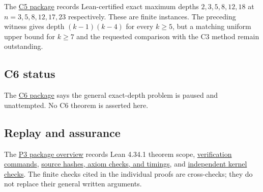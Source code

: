 \documentclass[11pt,a4paper]{article}
\begin{document}
The \href{https://github.com/mpelteshki/climbing-to-the-frontier/blob/212bba53b1818c08c40b8c4b48f636651eaf6410/cagent/p3/c5/README.md}{C5 package} records Lean-certified exact maximum depths \(2,3,5,8,12,18\) at \(n=3,5,8,12,17,23\) respectively. These are finite instances. The preceding witness gives depth \((k-1)(k-4)\) for every \(k\ge5\), but a matching uniform upper bound for \(k\ge7\) and the requested comparison with the C3 method remain outstanding.

\subsection{C6 status}\label{c6-status}

The \href{https://github.com/mpelteshki/climbing-to-the-frontier/blob/212bba53b1818c08c40b8c4b48f636651eaf6410/cagent/p3/c6/README.md}{C6 package} says the general exact-depth problem is paused and unattempted. No C6 theorem is asserted here.

\subsection{Replay and assurance}\label{replay-and-assurance}

The \href{https://github.com/mpelteshki/climbing-to-the-frontier/blob/212bba53b1818c08c40b8c4b48f636651eaf6410/cagent/p3/README.md}{P3 package overview} records Lean 4.34.1 theorem scope, \href{https://github.com/mpelteshki/climbing-to-the-frontier/blob/212bba53b1818c08c40b8c4b48f636651eaf6410/cagent/p3/verify.py}{verification commands}, \href{https://github.com/mpelteshki/climbing-to-the-frontier/blob/212bba53b1818c08c40b8c4b48f636651eaf6410/cagent/p3/evidence/verification.json}{source hashes, axiom checks, and timings}, and \href{https://github.com/mpelteshki/climbing-to-the-frontier/blob/212bba53b1818c08c40b8c4b48f636651eaf6410/cagent/p3/evidence/kernel-checks.json}{independent kernel checks}. The finite checks cited in the individual proofs are cross-checks; they do not replace their general written arguments.
\end{document}

